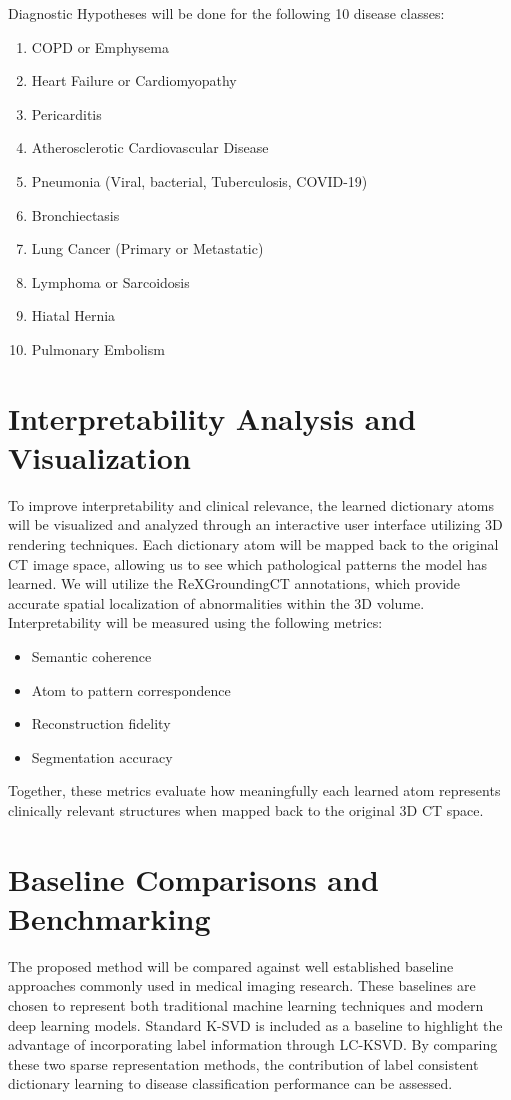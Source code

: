 Diagnostic Hypotheses will be done for the following 10 disease classes:
\begin{enumerate}
    \item COPD or Emphysema
    \item Heart Failure or Cardiomyopathy
    \item Pericarditis
    \item Atherosclerotic Cardiovascular Disease
    \item Pneumonia (Viral, bacterial, Tuberculosis, COVID-19)
    \item Bronchiectasis
    \item Lung Cancer (Primary or Metastatic)
    \item Lymphoma or Sarcoidosis
    \item Hiatal Hernia
    \item Pulmonary Embolism
\end{enumerate}

\section{Interpretability Analysis and Visualization}
To improve interpretability and clinical relevance, the learned dictionary atoms will be visualized and analyzed through an interactive
user interface utilizing 3D rendering techniques. Each dictionary atom will be mapped back to the original CT image space, allowing us
to see which pathological patterns the model has learned. We will utilize the ReXGroundingCT annotations, which provide accurate spatial
localization of abnormalities within the 3D volume. Interpretability will be measured using the following metrics:
\begin{itemize}
    \item Semantic coherence
    \item Atom to pattern correspondence
    \item Reconstruction fidelity
    \item Segmentation accuracy
\end{itemize}
Together, these metrics evaluate how meaningfully each learned atom represents clinically relevant structures when mapped back to the original 3D CT space.

\section{Baseline Comparisons and Benchmarking}
The proposed method will be compared against well established baseline approaches commonly used in medical imaging research. These
baselines are chosen to represent both traditional machine learning techniques and modern deep learning models. Standard K-SVD is
included as a baseline to highlight the advantage of incorporating label information through LC-KSVD. By comparing these two
sparse representation methods, the contribution of label consistent dictionary learning to disease classification performance can be
assessed.


